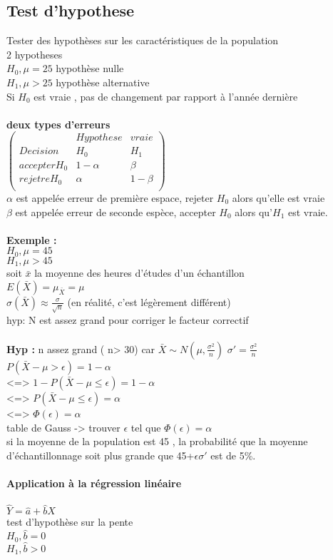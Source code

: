 \documentclass{article}
\begin{document}
\subsection{Test d'hypothese} Tester des hypothèses sur les caractéristiques de la population\\
2 hypotheses\\
$H_0, \mu =25$ hypothèse nulle\\
$H_1, \mu > 25$ hypothèse alternative\\
Si $H_0$ est vraie , pas de changement par rapport à l'année dernière\\\\
\textbf{deux types d'erreurs}\\
$\begin{pmatrix}
 & Hypothese & vraie \\
 Decision & H_0 & H_1 \\
 accepter H_0 & 1-\alpha & \beta \\
 rejetre H_0 & \alpha & 1-\beta \\
\end{pmatrix}$\\

$\alpha$ est appelée erreur de  première espace, rejeter $H_0$ alors qu'elle est vraie\\
$\beta$ est appelée erreur de seconde espèce, accepter $H_0$ alors qu'$H_1$ est vraie.\\\\

\textbf{Exemple : } \\
$H_0, \mu =45$\\
$H_1,\mu > 45$\\
soit $\bar{x}$ la moyenne des heures d'études d'un échantillon\\
$E(\bar{X}) = \mu_{\bar{X}} = \mu$\\
$\sigma(\bar{X}) \approx \frac{\sigma}{\sqrt{n}}$ (en réalité, c'est légèrement différent)\\
hyp:  N est assez grand pour corriger le facteur correctif\\\\
\textbf{Hyp : } n assez grand ( n> 30) car $\bar{X} \sim N(\mu, \frac{\sigma^2}{n})$  $\sigma' = \frac{\sigma^2}{n}$\\$P(\bar{X}- \mu > \epsilon) = 1-\alpha$ \\
 <=> $1-P(\bar{X}- \mu \leq \epsilon) = 1-\alpha$\\
 <=> $P(\bar{X}- \mu \leq \epsilon) = \alpha$\\
 <=> $\Phi(\epsilon) = \alpha$ \\
 table de Gauss -> trouver $\epsilon$ tel que $\Phi(\epsilon)=\alpha$\\
 si la moyenne de la population est 45 , la probabilité que la moyenne d'échantillonnage soit plus grande que 45+$\epsilon \sigma'$ est de 5\%.
 
\paragraph{Application à la régression linéaire}
$\hat{Y}= \hat{a}+\hat{b}X$\\test d'hypothèse sur la pente\\
$H_0,\hat{b}=0$\\
$H_1,\hat{b}>0$\\
\end{document}
